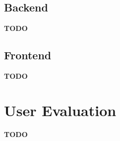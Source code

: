 \documentclass[a4paper,12pt]{report} %
\begin{document}



\section{Backend}
\textbf{TODO}

\section{Frontend}
\textbf{TODO}

\chapter{User Evaluation}
\textbf{TODO}




\end{document}
